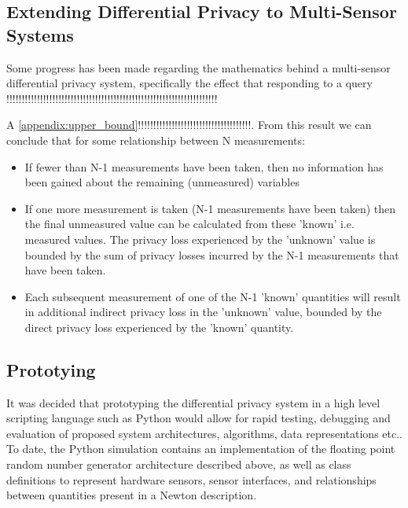 \documentclass[pageno]{jpaper}
\begin{document}
\subsection{Extending Differential Privacy to Multi-Sensor Systems} \label{subsection:multi_sensor}
Some progress has been made regarding the mathematics behind a multi-sensor differential privacy system, specifically the effect that responding to a query !!!!!!!!!!!!!!!!!!!!!!!!!!!!!!!!!!!!!!!!!!!!!!!!!!!!!!!!!!!!!!!!!!!!!

A \ref{appendix:upper_bound}!!!!!!!!!!!!!!!!!!!!!!!!!!!!!!!!!!!!!. From this result we can conclude that for some relationship between N measurements:
\begin{itemize}
  \item If fewer than N-1 measurements have been taken, then no information has been gained about the remaining (unmeasured) variables
  \item If one more measurement is taken (N-1 measurements have been taken) then the final unmeasured value can be calculated from these 'known' i.e. measured values. The privacy loss experienced by the 'unknown' value is bounded by the sum of privacy losses incurred by the N-1 measurements that have been taken.
  \item Each subsequent measurement of one of the N-1 'known' quantities will result in additional indirect privacy loss in the 'unknown' value, bounded by the direct privacy loss experienced by the 'known' quantity.
\end{itemize}

\subsection{Prototying}
It was decided that prototyping the differential privacy system in a high level scripting language such as Python would allow for rapid testing, debugging and evaluation of proposed system architectures, algorithms, data representations etc.. To date, the Python simulation contains an implementation of the floating point random number generator architecture described above\cite{DeSchryver}, as well as class definitions to represent hardware sensors, sensor interfaces, and relationships between quantities present in a Newton description.
\end{document}
